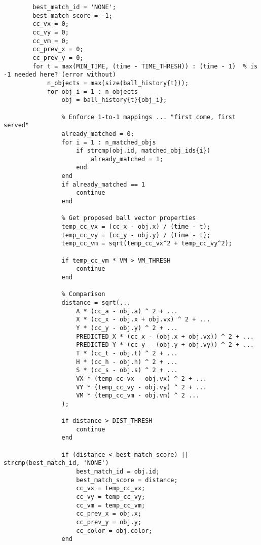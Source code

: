 \documentclass[12pt,a4paper]{article}
\begin{document}
\begin{appendices}
\begin{verbatim}
        best_match_id = 'NONE';
        best_match_score = -1;
        cc_vx = 0;
        cc_vy = 0;
        cc_vm = 0;
        cc_prev_x = 0;
        cc_prev_y = 0;
        for t = max(MIN_TIME, (time - TIME_THRESH)) : (time - 1)  % is -1 needed here? (error without)
            n_objects = max(size(ball_history{t}));
            for obj_i = 1 : n_objects
                obj = ball_history{t}{obj_i};
                
                % Enforce 1-to-1 mappings ... "first come, first served"
                already_matched = 0;
                for i = 1 : n_matched_objs
                    if strcmp(obj.id, matched_obj_ids{i})
                        already_matched = 1;
                    end
                end
                if already_matched == 1
                    continue
                end
                
                % Get proposed ball vector properties
                temp_cc_vx = (cc_x - obj.x) / (time - t);
                temp_cc_vy = (cc_y - obj.y) / (time - t);
                temp_cc_vm = sqrt(temp_cc_vx^2 + temp_cc_vy^2);
                
                if temp_cc_vm * VM > VM_THRESH
                    continue
                end
                
                % Comparison
                distance = sqrt(...
                    A * (cc_a - obj.a) ^ 2 + ...
                    X * (cc_x - obj.x + obj.vx) ^ 2 + ...
                    Y * (cc_y - obj.y) ^ 2 + ...
                    PREDICTED_X * (cc_x - (obj.x + obj.vx)) ^ 2 + ...
                    PREDICTED_Y * (cc_y - (obj.y + obj.vy)) ^ 2 + ...
                    T * (cc_t - obj.t) ^ 2 + ...
                    H * (cc_h - obj.h) ^ 2 + ...
                    S * (cc_s - obj.s) ^ 2 + ...
                    VX * (temp_cc_vx - obj.vx) ^ 2 + ...
                    VY * (temp_cc_vy - obj.vy) ^ 2 + ...
                    VM * (temp_cc_vm - obj.vm) ^ 2 ...
                );
            
                if distance > DIST_THRESH
                    continue
                end    
                
                if (distance < best_match_score) || strcmp(best_match_id, 'NONE')
                    best_match_id = obj.id;
                    best_match_score = distance;
                    cc_vx = temp_cc_vx;
                    cc_vy = temp_cc_vy;
                    cc_vm = temp_cc_vm;
                    cc_prev_x = obj.x;
                    cc_prev_y = obj.y;
                    cc_color = obj.color;
                end
                

\end{verbatim}
\end{appendices}
\end{document}
